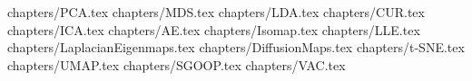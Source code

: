 \clearpage 
 {chapters/PCA.tex}
\clearpage
 {chapters/MDS.tex}
\clearpage
 {chapters/LDA.tex}
\clearpage
 {chapters/CUR.tex}
\clearpage
 {chapters/ICA.tex}
\clearpage
 {chapters/AE.tex}
\clearpage
 {chapters/Isomap.tex}
\clearpage
 {chapters/LLE.tex}
\clearpage
 {chapters/LaplacianEigenmaps.tex}
\clearpage
 {chapters/DiffusionMaps.tex}
\clearpage
 {chapters/t-SNE.tex}
\clearpage
 {chapters/UMAP.tex}
\clearpage
 {chapters/SGOOP.tex}
\clearpage
 {chapters/VAC.tex}